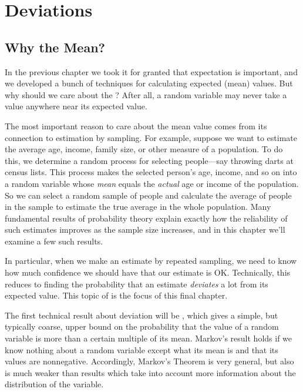 \chapter{Deviations}\label{deviation_chap}

\section{Why the Mean?}

In the previous chapter we took it for granted that expectation is
important, and we developed a bunch of techniques for calculating expected
(mean) values.  But why should we care about the ?  After all, a
random variable may never take a value anywhere near its expected value.

The most important reason to care about the mean value comes from its
connection to estimation by sampling.  For example, suppose we want to
estimate the average age, income, family size, or other measure of a
population.  To do this, we determine a random process for selecting
people---say throwing darts at census lists.  This process makes the
selected person's age, income, and so on into a random variable whose
\emph{mean} equals the \emph{actual } age or income of the
population.  So we can select a random sample of people and calculate the
average of people in the sample to estimate the true average in the whole
population.  Many fundamental results of probability theory explain
exactly how the reliability of such estimates improves as the sample size
increases, and in this chapter we'll examine a few such results.

In particular, when we make an estimate by repeated sampling, we need to
know how much confidence we should have that our estimate is OK.
Technically, this reduces to finding the probability that an estimate
\emph{deviates} a lot from its expected value.  This topic of
 is the focus of this final chapter.

The first technical result about deviation will be ,
which gives a simple, but typically coarse, upper bound on the
probability that the value of a random variable is more than a certain
multiple of its mean.  Markov's result holds if we know nothing about
a random variable except what its mean is and that its values are
nonnegative.  Accordingly, Markov's Theorem is very general, but also
is much weaker than results which take into account more information
about the distribution of the variable.

